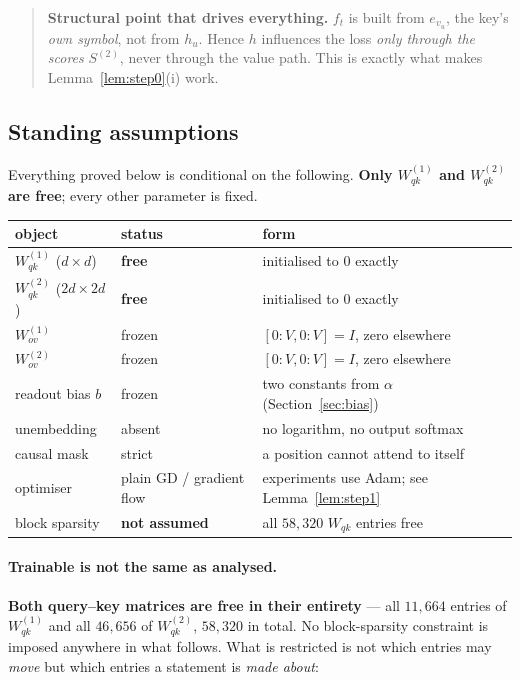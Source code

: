 \documentclass[11pt,a4paper]{article}
\theoremstyle{plain}
\theoremstyle{definition}
\newcommand{\1}{\mathbf{1}}
\begin{document}
\begin{quote}
\textbf{Structural point that drives everything.} $f_t$ is built from $e_{v_u}$, the key's
\emph{own symbol}, not from $h_u$. Hence $h$ influences the loss \emph{only through the scores}
$S^{(2)}$, never through the value path. This is exactly what makes Lemma~\ref{lem:step0}(i) work.
\end{quote}

\subsection{Standing assumptions}\label{sec:assume}

Everything proved below is conditional on the following. \textbf{Only $W^{(1)}_{qk}$ and
$W^{(2)}_{qk}$ are free}; every other parameter is fixed.

\begin{center}
\begin{tabular}{@{}lll@{}}
\toprule
object & status & form \\
\midrule
$W^{(1)}_{qk}$ ($d\times d$)   & \textbf{free} & initialised to $0$ exactly \\
$W^{(2)}_{qk}$ ($2d\times 2d$) & \textbf{free} & initialised to $0$ exactly \\
$W^{(1)}_{ov}$ & frozen & $[0{:}V,0{:}V]=I$, zero elsewhere \\
$W^{(2)}_{ov}$ & frozen & $[0{:}V,0{:}V]=I$, zero elsewhere \\
readout bias $b$ & frozen & two constants from $\alpha$ (Section~\ref{sec:bias}) \\
unembedding & absent & no logarithm, no output softmax \\
causal mask & strict & a position cannot attend to itself \\
optimiser & plain GD / gradient flow & experiments use Adam; see Lemma~\ref{lem:step1} \\
block sparsity & \textbf{not assumed} & all $58{,}320$ $W_{qk}$ entries free \\
\bottomrule
\end{tabular}
\end{center}

\paragraph{Trainable is not the same as analysed.}
\textbf{Both query--key matrices are free in their entirety} --- all $11{,}664$ entries of
$W^{(1)}_{qk}$ and all $46{,}656$ of $W^{(2)}_{qk}$, $58{,}320$ in total. No block-sparsity
constraint is imposed anywhere in what follows. What is restricted is not which entries may
\emph{move} but which entries a statement is \emph{made about}:
\end{document}
